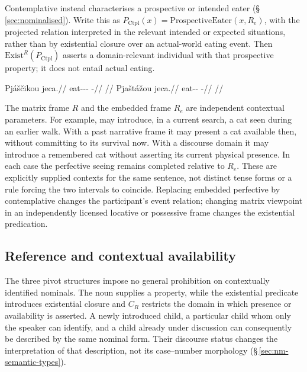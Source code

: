 Contemplative  instead characterises a prospective or intended
eater (§\,\ref{sec:nominalised}). Write this as
$P_{\mathrm{Ctpl}}(x)=\mathrm{ProspectiveEater}(x,R_e)$, with the projected
relation interpreted in the relevant intended or expected situations, rather
than by existential closure over an actual-world eating event. Then
$\mathrm{Exist}^{R}(P_{\mathrm{Ctpl}})$ asserts a domain-relevant individual
with that prospective property; it does not entail actual eating.

\pex
\a
\begingl
\gla Pjáščikou jeca.//
\glb eat-\Antip{}-\Pf{}-\Nmlz{} \Exst{}-\Cont{}//
\glft {} //
\endgl
\a
\begingl
\gla Pjaštážou jeca.//
\glb eat-\Ctpl{}-\Nmlz{} \Exst{}-\Cont{}//
\glft {} //
\endgl
\xe

The matrix frame $R$ and the embedded frame $R_e$ are independent contextual
parameters. For example,  may introduce, in a current
search, a cat seen during an earlier walk. With a past narrative frame it
may present a cat available then, without committing to its survival now.
With a discourse domain it may introduce a remembered cat without asserting
its current physical presence. In each case the perfective seeing remains
completed relative to $R_e$. These are explicitly supplied contexts for the
same sentence, not distinct tense forms or a rule forcing the two intervals
to coincide. Replacing embedded perfective by contemplative changes the
participant's event relation; changing matrix viewpoint in an independently
licensed locative or possessive frame changes the existential predication.

\subsection{Reference and contextual availability}
\label{sec:exst-reference}

The three pivot structures impose no general prohibition on contextually
identified nominals. The noun supplies a property, while the existential
predicate introduces existential closure and $C_R$ restricts the domain in
which presence or availability is asserted. A newly introduced child, a
particular child whom only the speaker can identify, and a child already
under discussion can consequently be described by the same nominal form.
Their discourse status changes the interpretation of that description, not
its case--number morphology (§\,\ref{sec:nm-semantic-types}).

